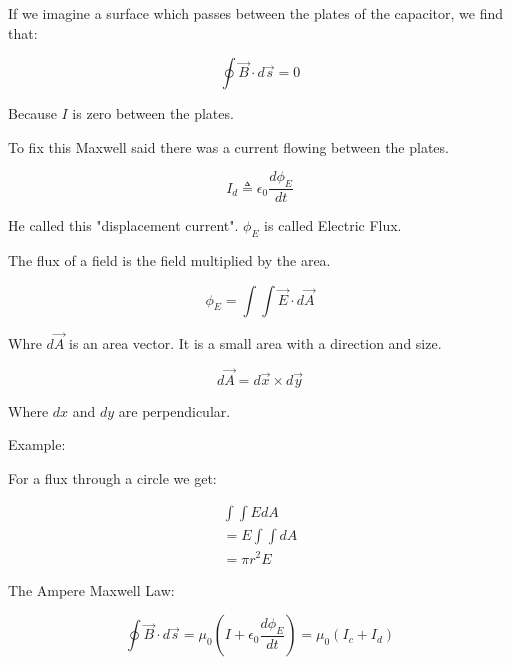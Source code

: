 \documentclass{report}
\begin{document}
\begin{description}
\begin{mdframed}
            If we imagine a surface which passes between the plates of the
            capacitor, we find that:

            \begin{displaymath}
                \oint \vec{B} \cdot d\vec{s} = 0
            \end{displaymath}

            Because $I$ is zero between the plates.

            To fix this Maxwell said there was a current
            flowing between the plates.

            \begin{displaymath}
                I_d \triangleq \epsilon_0 \frac{d \phi_E}{dt}
            \end{displaymath}

            He called this "displacement current".
            $\phi_E$ is called Electric Flux.

            The flux of a field is the field multiplied
            by the area.

            \begin{displaymath}
                \phi_E = \int \int \vec{E} \cdot d\vec{A}  
            \end{displaymath}

            Whre $d\vec{A}$ is an area vector. It is a small
            area with a direction and size.

             \begin{displaymath}
                 d\vec{A} = d\vec{x} \times d\vec{y}
            \end{displaymath}

            Where $dx$ and $dy$ are perpendicular.
            
            
            Example:
            \begin{mdframed}
                For a flux through a circle we get:

                \begin{gather}
                   \int \int E dA\\ 
                   = E \int \int dA\\
                   = \pi r^2 E
                \end{gather}
            \end{mdframed}
            
            The Ampere Maxwell Law:

            \begin{displaymath}
                \oint \vec{B} \cdot d\vec{s} = 
                \mu_0(I + \epsilon_0 \frac{d\phi_E}{dt})
                = \mu_0 (I_c + I_d)
            \end{displaymath}
            

\end{mdframed}
\end{description}
\end{document}
